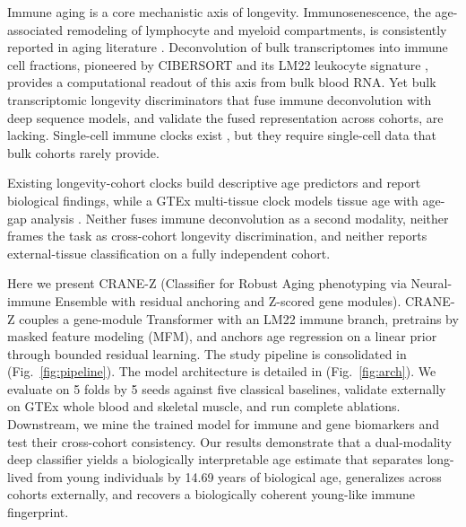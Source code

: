\documentclass[unnumsec,webpdf,contemporary,large]{oup-authoring-template}
\begin{document}
Immune aging is a core mechanistic axis of longevity. Immunosenescence, the age-associated remodeling of lymphocyte and myeloid compartments, is consistently reported in aging literature \cite{franceschi2018inflammaging,goronzy2017fifty,fulop2018immunosenescence,nikolich2008ageing,pawelec2018conundrum,weng2006aging,shaw2010aging,solana2012innate,lopez2013hallmarks,lopez2023hallmarks,fulop_2012,flemming_2021,filippov_2024,larsen_2024,slipchenko_2023}. Deconvolution of bulk transcriptomes into immune cell fractions, pioneered by CIBERSORT and its LM22 leukocyte signature \cite{newman2015robust,newman2019determining,aran2015systematic,wang2022deconvolution,zhou2024immune,zhang2022aging}, provides a computational readout of this axis from bulk blood RNA. Yet bulk transcriptomic longevity discriminators that fuse immune deconvolution with deep sequence models, and validate the fused representation across cohorts, are lacking. Single-cell immune clocks exist \cite{scimmuaging2025,hashimoto2019single,kamada2020single,chen2021singlecell}, but they require single-cell data that bulk cohorts rarely provide.

Existing longevity-cohort clocks build descriptive age predictors and report biological findings, while a GTEx multi-tissue clock models tissue age with age-gap analysis \cite{orange2026brief}. Neither fuses immune deconvolution as a second modality, neither frames the task as cross-cohort longevity discrimination, and neither reports external-tissue classification on a fully independent cohort.

Here we present CRANE-Z (Classifier for Robust Aging phenotyping via Neural-immune Ensemble with residual anchoring and Z-scored gene modules). CRANE-Z couples a gene-module Transformer with an LM22 immune branch, pretrains by masked feature modeling (MFM), and anchors age regression on a linear prior through bounded residual learning. The study pipeline is consolidated in (Fig.~\ref{fig:pipeline}). The model architecture is detailed in (Fig.~\ref{fig:arch}). We evaluate on 5 folds by 5 seeds against five classical baselines, validate externally on GTEx whole blood and skeletal muscle, and run complete ablations. Downstream, we mine the trained model for immune and gene biomarkers and test their cross-cohort consistency. Our results demonstrate that a dual-modality deep classifier yields a biologically interpretable age estimate that separates long-lived from young individuals by 14.69 years of biological age, generalizes across cohorts externally, and recovers a biologically coherent young-like immune fingerprint.
\end{document}
